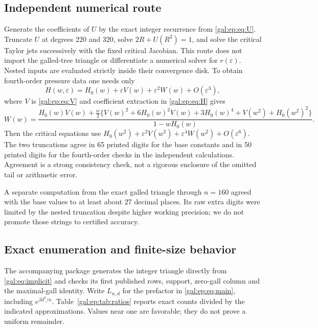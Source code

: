 \documentclass[11pt,letterpaper]{article}
\numberwithin{equation}{section}
\theoremstyle{definition}\newtheorem{definition}[theorem]{Definition}
\theoremstyle{remark}\newtheorem{remark}[theorem]{Remark}
\newcommand{\eps}{\varepsilon}
\begin{document}
\subsection{Independent numerical route}
Generate the coefficients of $U$ by the exact integer recurrence from \eqref{gal:ep:eq:U}. Truncate $U$ at degrees 220 and 320, solve $2R+U(R^2)=1$, and solve the critical Taylor jets successively with the fixed critical Jacobian. This route does not import the galled-tree triangle or differentiate a numerical solver for $r(\eps)$. Nested inputs are evaluated strictly inside their convergence disk. To obtain fourth-order pressure data one needs only
\[
H(w,\eps)=H_0(w)+\eps V(w)+\eps^2W(w)+O(\eps^3),
\]
where $V$ is \eqref{gal:ep:eq:V} and coefficient extraction in \eqref{gal:ep:eq:H} gives
\begin{equation}\label{gal:ep:eq:W}
W(w)=\frac{H_0(w)V(w)+\frac w2\{V(w)^2+6H_0(w)^2V(w)
+3H_0(w)^4+V(w^2)+H_0(w^2)^2\}}{1-wH_0(w)}.
\end{equation}
Then the critical equations use $H_0(w^2)+\eps^2V(w^2)+\eps^4W(w^2)+O(\eps^6)$. The two truncations agree in 65 printed digits for the base constants and in 50 printed digits for the fourth-order checks in the independent calculations. Agreement is a strong consistency check, not a rigorous enclosure of the omitted tail or arithmetic error.

A separate computation from the exact galled triangle through $n=160$ agreed with the base values to at least about 27 decimal places. Its raw extra digits were limited by the nested truncation despite higher working precision; we do not promote those strings to certified accuracy.

\subsection{Exact enumeration and finite-size behavior}
The accompanying package generates the integer triangle directly from \eqref{gal:eq:implicit} and checks its first published rows, support, zero-gall column and the maximal-gall identity. Write $L_{n,d}$ for the prefactor in \eqref{gal:ep:eq:main}, including $e^{\beta d^2/n}$. Table~\ref{gal:ep:tab:ratios} reports exact counts divided by the indicated approximations. Values near one are favorable; they do not prove a uniform remainder.
\end{document}
